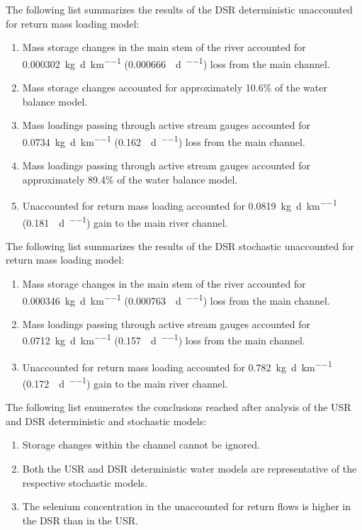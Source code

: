The following list summarizes the results of the DSR deterministic unaccounted for return mass loading model:
\begin{enumerate}
	\item Mass storage changes in the main stem of the river accounted for \SI{0.000302}{\kilo\g\per\day\per\kilo\m} (\SI{0.000666}{\pound\per\day\per\mile}) loss from the main channel.
	\item Mass storage changes accounted for approximately 10.6\% of the water balance model.
	\item Mass loadings passing through active stream gauges accounted for \SI{0.0734}{\kilo\g\per\day\per\kilo\m} (\SI{0.162}{\pound\per\day\per\mile}) loss from the main channel.
	\item Mass loadings passing through active stream gauges accounted for approximately 89.4\% of the water balance model.
	\item Unaccounted for return mass loading accounted for \SI{0.0819}{\kilo\g\per\day\per\kilo\m} (\SI{0.181}{\pound\per\day\per\mile}) gain to the main river channel.
\end{enumerate}

The following list summarizes the results of the DSR stochastic unaccounted for return mass loading model:
\begin{enumerate}
	\item Mass storage changes in the main stem of the river accounted for \SI{0.000346}{\kilo\g\per\day\per\kilo\m} (\SI{0.000763}{\pound\per\day\per\mile}) loss from the main channel.
	\item Mass loadings passing through active stream gauges accounted for \SI{0.0712}{\kilo\g\per\day\per\kilo\m} (\SI{0.157}{\pound\per\day\per\mile}) loss from the main channel.
	\item Unaccounted for return mass loading accounted for \SI{0.782}{\kilo\g\per\day\per\kilo\m} (\SI{0.172}{\pound\per\day\per\mile}) gain to the main river channel.
\end{enumerate}

The following list enumerates the conclusions reached after analysis of the USR and DSR deterministic and stochastic models:
\begin{enumerate}
	\item Storage changes within the channel cannot be ignored.
	\item Both the USR and DSR deterministic water models are representative of the respective stochastic models.
	\item The selenium concentration in the unaccounted for return flows is higher in the DSR than in the USR.
\end{enumerate}
\clearpage{}


